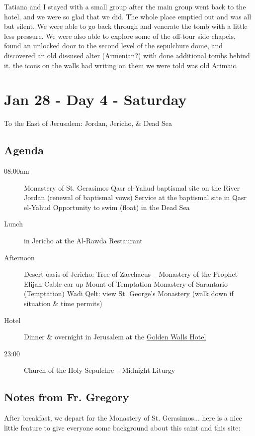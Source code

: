 \documentclass[letterpaper]{report}
\begin{document}
Tatiana and I stayed with a small group after the main group went back to the hotel,
and we were so glad that we did.
The whole place emptied out and was all but silent.
We were able to go back through and venerate the tomb with a little less pressure.
We were also able to explore some of the off-tour side chapels,
found an unlocked door to the second level of the sepulchure dome,
and discovered an old dissused alter (Armenian?) with done additional tombs behind it. the icons on the walls had writing on them we were told was old Arimaic.


\clearpage
\chapter{Jan 28 - Day 4 - Saturday}
To the East of Jerusalem: Jordan, Jericho, \& Dead Sea

\section{Agenda}
\begin{description}
	\item[08:00am]  Monastery of St. Gerasimos
	  \subitem Qasr el-Yahud baptismal site on the River Jordan
	    (renewal of baptismal vows)
	  \subitem Service at the baptismal site in Qasr el-Yahud
	  \subitem Opportunity to swim (float) in the Dead Sea
	\item[Lunch] in Jericho at the Al-Rawda Restaurant 
	\item[Afternoon] Desert oasis of Jericho: Tree of Zacchaeus – Monastery of the Prophet Elijah
	  \subitem Cable car up Mount of Temptation
	  \subitem Monastery of Sarantario (Temptation)
	  \subitem Wadi Qelt: view St. George's Monastery (walk down if situation \& time permits) 
	\item[Hotel] Dinner \& overnight in Jerusalem at the
	  \href{http://goldenwalls.com/}{Golden Walls Hotel}
	\item[23:00]  Church of the Holy Sepulchre – Midnight Liturgy
\end{description}

\section{Notes from Fr. Gregory}
After breakfast, we depart for the Monastery of St. Gerasimos...
here is a nice little feature to give everyone some background about this
saint and this site:
\end{document}
